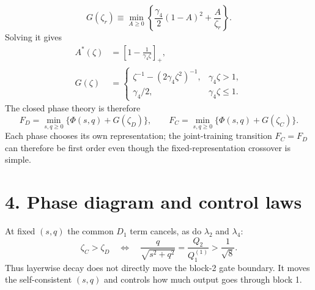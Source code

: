 \documentclass[10pt]{article}
\begin{document}
\begin{equation}
G(\zeta_r)\equiv\min_{A\geq0}\left\{
\frac{\gamma_4}{2}(1-A)^2+\frac{A}{\zeta_r}\right\}.
\label{eq:g-definition}
\end{equation}
Solving it gives
\begin{align}
A^*(\zeta)&=\left[1-\frac1{\gamma_4\zeta}\right]_+,\nonumber\\[-2pt]
G(\zeta)&=
\begin{cases}
\zeta^{-1}-(2\gamma_4\zeta^2)^{-1},&\gamma_4\zeta>1,\\
\gamma_4/2,&\gamma_4\zeta\leq1.
\end{cases}
\label{eq:target-free}
\end{align}
The closed phase theory is therefore
\begin{equation}
\boxed{F_D=\min_{s,q\geq0}\{\Phi(s,q)+G(\zeta_D)\},\qquad
F_C=\min_{s,q\geq0}\{\Phi(s,q)+G(\zeta_C)\}.}
\label{eq:free-energies}
\end{equation}
Each phase chooses its own representation; the joint-training transition $F_C=F_D$ can
therefore be first order even though the fixed-representation crossover is simple.

\section*{4. Phase diagram and control laws}
At fixed $(s,q)$ the common $D_1$ term cancels, as do $\lambda_2$ and $\lambda_4$:
\begin{equation}
\zeta_C>\zeta_D
\quad\Longleftrightarrow\quad
\frac{q}{\sqrt{s^2+q^2}}=\frac{Q_2}{Q_1^{(1)}}>\frac1{\sqrt8}.
\label{eq:boundary}
\end{equation}
Thus layerwise decay does not directly move the block-2 gate boundary.  It moves the
self-consistent $(s,q)$ and controls how much output goes through block 1.
\end{document}

